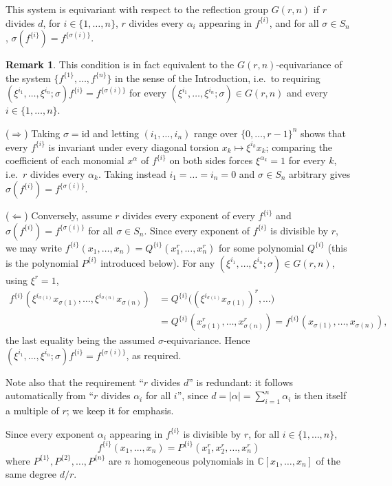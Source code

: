 \documentclass[12pt]{amsart}
\theoremstyle{definition}
\newtheorem{remark}[theorem]{Remark}
\begin{document}
This system is equivariant with respect to the reflection group $G(r,n)$ if $r$ divides $d$, for $i \in \{1,\dots,n\}$, $r$ divides every $\alpha_i$ appearing in $f^{\{i\}}$, and for all $\sigma \in S_n$, $\sigma(f^{\{i\}}) = f^{\{\sigma(i)\}}$.

\begin{remark}
This condition is in fact equivalent to the $G(r,n)$-equivariance of the system $\{f^{\{1\}},\dots,f^{\{n\}}\}$ in the sense of the Introduction, i.e.\ to requiring $(\xi^{i_1},\dots,\xi^{i_n};\sigma)f^{\{i\}} = f^{\{\sigma(i)\}}$ for every $(\xi^{i_1},\dots,\xi^{i_n};\sigma)\in G(r,n)$ and every $i \in \{1,\dots,n\}$.

($\Rightarrow$) Taking $\sigma = \mathrm{id}$ and letting $(i_1,\dots,i_n)$ range over $\{0,\dots,r-1\}^n$ shows that every $f^{\{i\}}$ is invariant under every diagonal torsion $x_k \mapsto \xi^{i_k}x_k$; comparing the coefficient of each monomial $x^\alpha$ of $f^{\{i\}}$ on both sides forces $\xi^{\alpha_k}=1$ for every $k$, i.e.\ $r$ divides every $\alpha_k$. Taking instead $i_1=\dots=i_n=0$ and $\sigma \in S_n$ arbitrary gives $\sigma(f^{\{i\}}) = f^{\{\sigma(i)\}}$.

($\Leftarrow$) Conversely, assume $r$ divides every exponent of every $f^{\{i\}}$ and $\sigma(f^{\{i\}}) = f^{\{\sigma(i)\}}$ for all $\sigma \in S_n$. Since every exponent of $f^{\{i\}}$ is divisible by $r$, we may write $f^{\{i\}}(x_1,\dots,x_n) = Q^{\{i\}}(x_1^r,\dots,x_n^r)$ for some polynomial $Q^{\{i\}}$ (this is the polynomial $P^{\{i\}}$ introduced below). For any $(\xi^{i_1},\dots,\xi^{i_n};\sigma)\in G(r,n)$, using $\xi^r=1$,
\begin{align*}
f^{\{i\}}(\xi^{i_{\sigma(1)}}x_{\sigma(1)},\dots,\xi^{i_{\sigma(n)}}x_{\sigma(n)}) &= Q^{\{i\}}\big((\xi^{i_{\sigma(1)}}x_{\sigma(1)})^r,\dots\big) \\
&= Q^{\{i\}}(x_{\sigma(1)}^r,\dots,x_{\sigma(n)}^r) = f^{\{i\}}(x_{\sigma(1)},\dots,x_{\sigma(n)}),
\end{align*}
the last equality being the assumed $\sigma$-equivariance. Hence $(\xi^{i_1},\dots,\xi^{i_n};\sigma)f^{\{i\}} = f^{\{\sigma(i)\}}$, as required.
\end{remark}

Note also that the requirement ``$r$ divides $d$'' is redundant: it follows automatically from ``$r$ divides $\alpha_i$ for all $i$'', since $d = |\alpha| = \sum_{i=1}^n \alpha_i$ is then itself a multiple of $r$; we keep it for emphasis.

Since every exponent $\alpha_i$ appearing in $f^{\{i\}}$ is divisible by $r$, for all $i \in \{1,\dots,n\}$,
\[
f^{\{i\}}(x_1,\dots,x_n) = P^{\{i\}}(x_1^r, x_2^r,\dots,x_n^r)
\]
where $P^{\{1\}}, P^{\{2\}}, \dots, P^{\{n\}}$ are $n$ homogeneous polynomials in $\mathbb{C}[x_1,\dots,x_n]$ of the same degree $d/r$.
\end{document}

